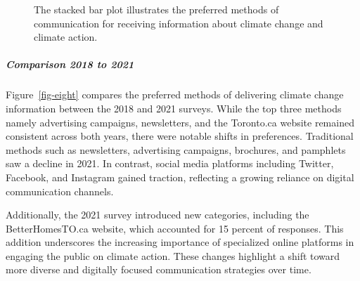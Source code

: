 \documentclass[
  letterpaper,
  DIV=11,
  numbers=noendperiod]{scrartcl}
\let\oldsubparagraph\subparagraph
\renewcommand{\subparagraph}[1]{\oldsubparagraph{#1}\mbox{}}
\begin{document}
\begin{figure}


\caption{\label{fig-seven}The stacked bar plot illustrates the preferred
methods of communication for receiving information about climate change
and climate action.}

\end{figure}%

\subparagraph{Comparison 2018 to 2021}\label{comparison-2018-to-2021-3}

Figure~\ref{fig-eight} compares the preferred methods of delivering
climate change information between the 2018 and 2021 surveys. While the
top three methods namely advertising campaigns, newsletters, and the
Toronto.ca website remained consistent across both years, there were
notable shifts in preferences. Traditional methods such as newsletters,
advertising campaigns, brochures, and pamphlets saw a decline in 2021.
In contrast, social media platforms including Twitter, Facebook, and
Instagram gained traction, reflecting a growing reliance on digital
communication channels.

Additionally, the 2021 survey introduced new categories, including the
BetterHomesTO.ca website, which accounted for 15 percent of responses.
This addition underscores the increasing importance of specialized
online platforms in engaging the public on climate action. These changes
highlight a shift toward more diverse and digitally focused
communication strategies over time.
\end{document}
